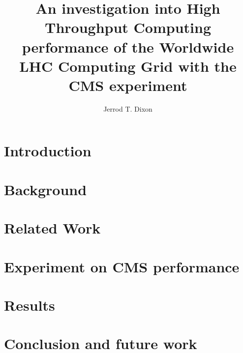 \documentclass[]{acmart}
\title{An investigation into High Throughput Computing performance of the Worldwide LHC Computing Grid with the CMS experiment}
\author{Jerrod T. Dixon}
\begin{document}
\maketitle

\begin{abstract}

\end{abstract}

\section{Introduction}

\section{Background}

\section{Related Work}

\section{Experiment on CMS performance}

\section{Results}

\section{Conclusion and future work}
\end{document}
